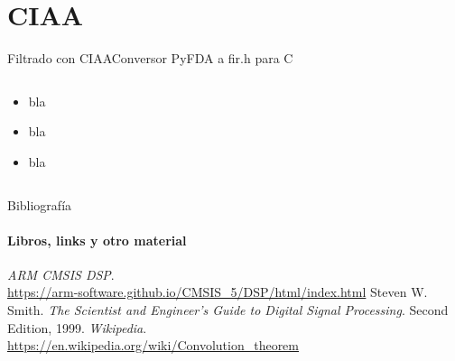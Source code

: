 \section{CIAA}
\begin{frame}[t]{Filtrado con CIAA}{Conversor PyFDA a fir.h para C}
   \handsonicon
   \begin{columns}[t]
      \begin{column}{.4\textwidth}
         \begin{itemize}
            \item{bla}
            \item{bla}
            \item{bla}
         \end{itemize}
      \end{column}
      \hspace{2pt}
      \vrule
      \hspace{2pt}
      \begin{column}{.6\textwidth}
      \end{column}
      \hspace{2pt}
   \end{columns}

   \vfill
\end{frame}
\begin{frame}{Bibliografía}
   \framesubtitle{Libros, links y otro material}
   \begin{thebibliography}{9}
         \emph{ARM CMSIS DSP}. \\
         \href {https://arm-software.github.io/CMSIS_5/DSP/html/index.html}{https://arm-software.github.io/CMSIS\_5/DSP/html/index.html}
         Steven W. Smith.
         \emph{The Scientist and Engineer's Guide to Digital Signal Processing}.
         Second Edition, 1999.
         \emph{Wikipedia}. \\
         \href {https://en.wikipedia.org/wiki/Convolution\_theorem}{https://en.wikipedia.org/wiki/Convolution\_theorem}
   \end{thebibliography}
\end{frame}

